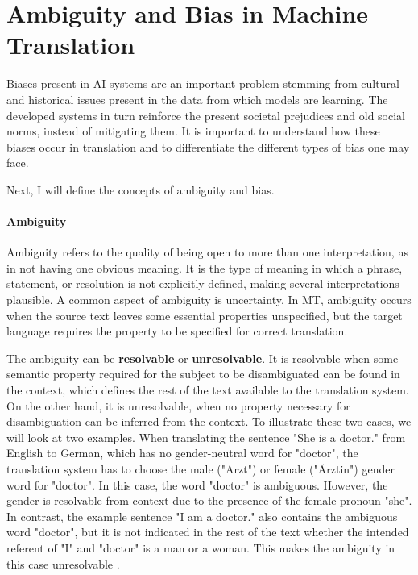 
\section{Ambiguity and Bias in Machine Translation}
\label{sec:Background:Ambiguity_Bias}
Biases present in AI systems are an important problem stemming from cultural and historical issues present in the data from which models are learning. The developed systems in turn reinforce the present societal prejudices and old social norms, instead of mitigating them. 
It is important to understand how these biases occur in translation and to differentiate the different types of bias one may face.

Next, I will define the concepts of ambiguity and bias.

\paragraph{Ambiguity}
Ambiguity refers to the quality of being open to more than one interpretation, as in not having one obvious meaning. It is the type of meaning in which a phrase, statement, or resolution is not explicitly defined, making several interpretations plausible. A common aspect of ambiguity is uncertainty. In MT, ambiguity occurs when the source text leaves some essential properties unspecified, but the target language requires the property to be specified for correct translation. 

The ambiguity can be \textbf{resolvable} or \textbf{unresolvable}. It is resolvable when some semantic property required for the subject to be disambiguated can be found in the context, which defines the rest of the text available to the translation system. On the other hand, it is unresolvable, when no property necessary for disambiguation can be inferred from the context. To illustrate these two cases, we will look at two examples. When translating the sentence "She is a doctor." from English to German, which has no gender-neutral word for "doctor", the translation system has to choose the male ("Arzt") or female ("Ärztin") gender word for "doctor". In this case, the word "doctor" is ambiguous. However, the gender is resolvable from context due to the presence of the female pronoun "she". In contrast, the example sentence "I am a doctor." also contains the ambiguous word "doctor", but it is not indicated in the rest of the text whether the intended referent of "I" and "doctor" is a man or a woman. This makes the ambiguity in this case unresolvable \parencite{bias_taxonomy}.

